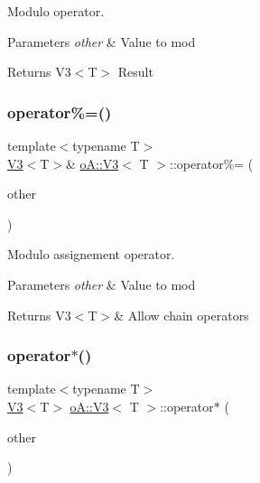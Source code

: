 Modulo operator. 


\begin{DoxyParams}{Parameters}
{\em other} & Value to mod \\
\hline
\end{DoxyParams}
\begin{DoxyReturn}{Returns}
V3$<$\+T$>$ Result 
\end{DoxyReturn}
\mbox{\label{structo_a_1_1_v3_ad311ac93d7c947c590a45320fbee26ac}} 
\subsubsection{\texorpdfstring{operator\%=()}{operator\%=()}}
{\footnotesize\ttfamily template$<$typename T$>$ \\
\mbox{\hyperlink{structo_a_1_1_v3}{V3}}$<$T$>$\& \mbox{\hyperlink{structo_a_1_1_v3}{o\+A\+::\+V3}}$<$ T $>$\+::operator\%= (\begin{DoxyParamCaption}\item[{const \mbox{\hyperlink{structo_a_1_1_v3}{o\+A\+::\+V3}}$<$ T $>$ \&}]{other }\end{DoxyParamCaption})\hspace{0.3cm}{\ttfamily [inline]}}



Modulo assignement operator. 


\begin{DoxyParams}{Parameters}
{\em other} & Value to mod \\
\hline
\end{DoxyParams}
\begin{DoxyReturn}{Returns}
V3$<$\+T$>$\& Allow chain operators 
\end{DoxyReturn}
\mbox{\label{structo_a_1_1_v3_a6171d787358a1cffd89786d4f13578bb}} 
\subsubsection{\texorpdfstring{operator$\ast$()}{operator*()}}
{\footnotesize\ttfamily template$<$typename T$>$ \\
\mbox{\hyperlink{structo_a_1_1_v3}{V3}}$<$T$>$ \mbox{\hyperlink{structo_a_1_1_v3}{o\+A\+::\+V3}}$<$ T $>$\+::operator$\ast$ (\begin{DoxyParamCaption}\item[{const \mbox{\hyperlink{structo_a_1_1_v3}{o\+A\+::\+V3}}$<$ T $>$ \&}]{other }\end{DoxyParamCaption})\hspace{0.3cm}{\ttfamily [inline]}}



